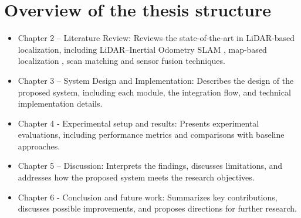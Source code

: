 \section{Overview of the thesis structure}
\begin{itemize}
    \item Chapter 2 – Literature Review: Reviews the state-of-the-art in LiDAR-based localization, including LiDAR–Inertial Odometry SLAM , map-based localization , scan matching and sensor fusion techniques.
    \item Chapter 3 – System Design and Implementation: Describes the design of the proposed system, including each module, the integration flow, and technical implementation details.
    \item Chapter 4 - Experimental setup and results: Presents experimental evaluations, including performance metrics and comparisons with baseline approaches.
    \item Chapter 5 – Discussion: Interprets the findings, discusses limitations, and addresses how the proposed system meets the research objectives.
    \item Chapter 6 - Conclusion and future work: Summarizes key contributions, discusses possible improvements, and proposes directions for further research.
\end{itemize}





